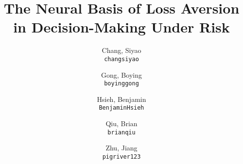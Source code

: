 \documentclass[11pt]{article}
\title{The Neural Basis of Loss Aversion in Decision-Making Under Risk}
\author{
  Chang, Siyao \\
  \texttt{changsiyao}
  \and
  Gong, Boying\\
  \texttt{boyinggong}
  \and
  Hsieh, Benjamin\\
  \texttt{BenjaminHsieh}
  \and
  Qiu, Brian\\
  \texttt{brianqiu}
  \and
  Zhu, Jiang\\
  \texttt{pigriver123}
}
\begin{document}
\maketitle

\abstract{}













\end{document}
